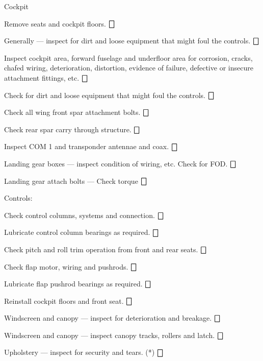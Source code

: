 \begin{enumerate*}
	\item{Cockpit} 
	\begin{enumerate*}
		\item Remove seats and cockpit floors.  \dotfill $\bigbox$
		\item Generally --- inspect for dirt and loose equipment that might foul the controls. \dotfill $\bigbox$
		\item Inspect cockpit area, forward fuselage and underfloor area for corrosion, cracks, chafed wiring, deterioration, distortion, evidence of failure, defective or insecure attachment fittings, etc.  \dotfill $\bigbox$
		\item Check for dirt and loose equipment that might foul the controls. \dotfill $\bigbox$
		\item Check all wing front spar attachment bolts. \dotfill $\bigbox$
		\item Check rear spar carry through structure. \dotfill $\bigbox$
		\item Inspect COM 1 and transponder antennae and coax. \dotfill $\bigbox$
		\item Landing gear boxes --- inspect condition of wiring, etc.  Check for FOD. \dotfill $\bigbox$
		\item Landing gear attach bolts --- Check torque \dotfill $\bigbox$
		\item Controls:
  	\begin{enumerate*}
  		\item Check control columns, systems and connection. \dotfill $\bigbox$
  		\item Lubricate control column bearings as required. \dotfill $\bigbox$
  		\item Check pitch and roll trim operation from front and rear seats.  \dotfill $\bigbox$
  		\item Check flap motor, wiring and pushrods. \dotfill $\bigbox$
  		\item Lubricate flap pushrod bearings as required. \dotfill $\bigbox$
  	  \end{enumerate*}
		\item Reinstall cockpit floors and front seat.  \dotfill $\bigbox$
		\item Windscreen and canopy --- inspect for deterioration and breakage. \dotfill $\bigbox$
		\item Windscreen and canopy --- inspect canopy tracks, rollers and latch. \dotfill $\bigbox$
		\item Upholstery --- inspect for security and tears. (*) \dotfill $\bigbox$

\end{enumerate*}
\end{enumerate*}
